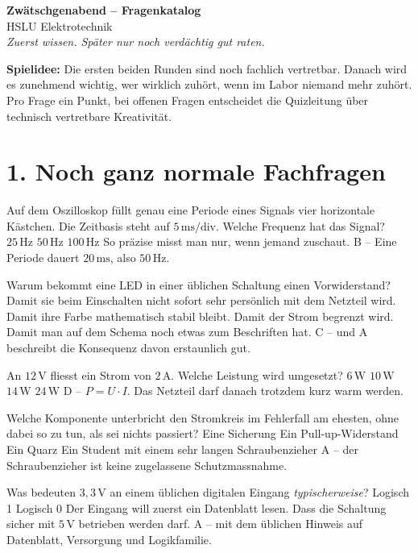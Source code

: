\documentclass[a4paper,11pt]{article}
\newcommand{\runde}[1]{\newpage\section*{#1}\addcontentsline{toc}{section}{#1}}
\begin{document}
\begin{center}
  {\LARGE\bfseries Zwätschgenabend -- Fragenkatalog}\\[0.4em]
  {\large HSLU Elektrotechnik}\\[0.8em]
  \textit{Zuerst wissen. Später nur noch verdächtig gut raten.}
\end{center}

\noindent
\textbf{Spielidee:} Die ersten beiden Runden sind noch fachlich vertretbar.
Danach wird es zunehmend wichtig, wer wirklich zuhört, wenn im Labor niemand
mehr zuhört. Pro Frage ein Punkt, bei offenen Fragen entscheidet die
Quizleitung über technisch vertretbare Kreativität.

\runde{1. Noch ganz normale Fachfragen}

Auf dem Oszilloskop füllt genau eine Periode eines Signals vier horizontale
Kästchen. Die Zeitbasis steht auf $5\,\mathrm{ms/div}$. Welche Frequenz hat das
Signal?
{$25\,\mathrm{Hz}$}
{$50\,\mathrm{Hz}$}
{$100\,\mathrm{Hz}$}
{So präzise misst man nur, wenn jemand zuschaut.}
{B -- Eine Periode dauert $20\,\mathrm{ms}$, also $50\,\mathrm{Hz}$.}

Warum bekommt eine LED in einer üblichen Schaltung einen Vorwiderstand?
{Damit sie beim Einschalten nicht sofort sehr persönlich mit dem Netzteil wird.}
{Damit ihre Farbe mathematisch stabil bleibt.}
{Damit der Strom begrenzt wird.}
{Damit man auf dem Schema noch etwas zum Beschriften hat.}
{C -- und A beschreibt die Konsequenz davon erstaunlich gut.}

An $12\,\mathrm{V}$ fliesst ein Strom von $2\,\mathrm{A}$. Welche Leistung
wird umgesetzt?
{$6\,\mathrm{W}$}
{$10\,\mathrm{W}$}
{$14\,\mathrm{W}$}
{$24\,\mathrm{W}$}
{D -- $P=U\cdot I$. Das Netzteil darf danach trotzdem kurz warm werden.}

Welche Komponente unterbricht den Stromkreis im Fehlerfall am ehesten,
ohne dabei so zu tun, als sei nichts passiert?
{Eine Sicherung}
{Ein Pull-up-Widerstand}
{Ein Quarz}
{Ein Student mit einem sehr langen Schraubenzieher}
{A -- der Schraubenzieher ist keine zugelassene Schutzmassnahme.}

Was bedeuten $3{,}3\,\mathrm{V}$ an einem üblichen digitalen Eingang
\emph{typischerweise}?
{Logisch 1}
{Logisch 0}
{Der Eingang will zuerst ein Datenblatt lesen.}
{Dass die Schaltung sicher mit $5\,\mathrm{V}$ betrieben werden darf.}
{A -- mit dem üblichen Hinweis auf Datenblatt, Versorgung und Logikfamilie.}
\end{document}
